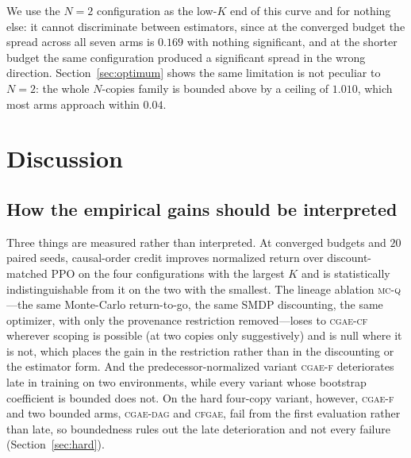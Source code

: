 \documentclass[review,authoryear,3p,times]{elsarticle}
\newcommand{\cflow}{\textsc{cgae-cf}}          %
\newcommand{\cflowraw}{\textsc{cgae-f}}        %
\newcommand{\cdag}{\textsc{cgae-dag}}          %
\newcommand{\mcq}{\textsc{mc-q}}
\newcommand{\cfgae}{\textsc{cfgae}}
\begin{document}
We use the $N{=}2$ configuration as the low-$K$ end of this curve and for
nothing else: it cannot discriminate between estimators, since at the converged
budget the spread across all seven arms is $0.169$ with nothing significant, and
at the shorter budget the same configuration produced a significant spread in
the wrong direction. Section~\ref{sec:optimum} shows the same limitation is not
peculiar to $N{=}2$: the whole $N$-copies family is bounded above by a ceiling
of $1.010$, which most arms approach within $0.04$.


\section{Discussion}
\label{sec:discussion}

\subsection{How the empirical gains should be interpreted}
\label{sec:mechanism}

Three things are measured rather than interpreted. At converged budgets and $20$
paired seeds, causal-order credit improves normalized return over
discount-matched PPO on the four configurations with the largest $K$ and is
statistically indistinguishable from it on the two with the smallest. The
lineage ablation \mcq{}---the same Monte-Carlo return-to-go, the same SMDP
discounting, the same optimizer, with only the provenance restriction
removed---loses to \cflow{} wherever scoping is possible (at two copies only
suggestively) and is null where it is not, which places the gain in the
restriction rather than in the discounting or the estimator form. And the predecessor-normalized variant \cflowraw{}
deteriorates late in training on two environments, while every variant whose
bootstrap coefficient is bounded does not. On the hard four-copy variant,
however, \cflowraw{} and two bounded arms, \cdag{} and \cfgae, fail from the
first evaluation rather than late, so boundedness rules out the late
deterioration and not every failure (Section~\ref{sec:hard}).
\end{document}
